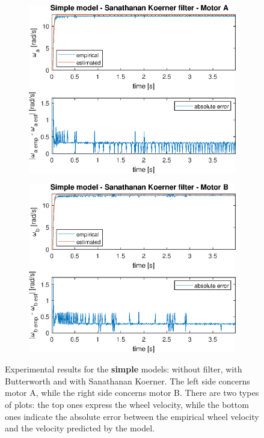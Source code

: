 \documentclass[a4paper,kul]{kulakarticle} %
\begin{document}
\begin{figure}[htp!]
\begin{subfigure}[b]{0.48\textwidth}
		\includegraphics[width=\linewidth]{step_response_simple_SK_a.eps}
	\end{subfigure}
	\hfill
	\begin{subfigure}[b]{0.48\textwidth}
		\centering
		\includegraphics[width=\linewidth]{step_response_simple_SK_b.eps}
	\end{subfigure}
	\caption[Experimental results for the simple models]{Experimental results for the \textbf{simple} models: without filter, with Butterworth and with Sanathanan Koerner. The left side concerns motor A, while the right side concerns motor B. There are two types of plots: the top ones express the wheel velocity, while the bottom ones indicate the absolute error between the empirical wheel velocity and the velocity predicted by the model.}
	\label{fig:validation_simple}
\end{figure}
\end{document}
